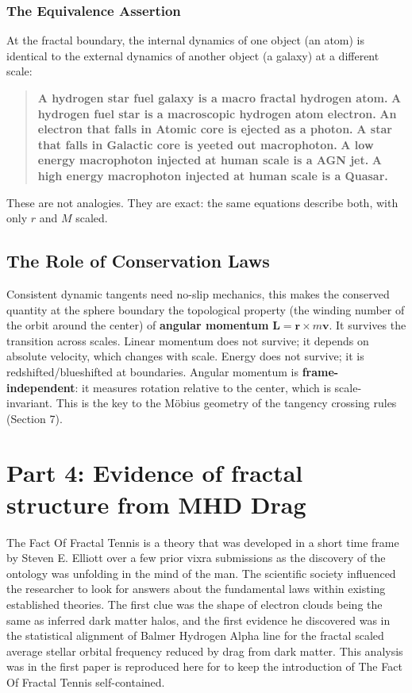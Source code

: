 \documentclass[11pt,a4paper]{article}
\begin{document}
\subsubsection{The Equivalence Assertion}

At the fractal boundary, the internal dynamics of one object (an atom) is identical to the external dynamics of another object (a galaxy) at a different scale:

\begin{quote}
\textbf{A hydrogen star fuel galaxy is a macro fractal hydrogen atom.}
\textbf{A hydrogen fuel star is a macroscopic hydrogen atom electron.}
\textbf{An electron that falls in Atomic core is ejected as a photon.}
\textbf{A star that falls in Galactic core is yeeted out macrophoton.}
\textbf{A low energy macrophoton injected at human scale is a AGN jet.}
\textbf{A high energy macrophoton injected at human scale is a Quasar.}
\end{quote}

These are not analogies. They are exact: the same  equations describe both, with only $r$ and $M$ scaled.

\subsection{The Role of Conservation Laws}

Consistent dynamic tangents need no-slip mechanics, this makes the conserved quantity at the sphere boundary the topological property (the winding number of the orbit around the center) of \textbf{angular momentum} $\mathbf{L} = \mathbf{r} \times m\mathbf{v}$. It survives the transition across scales. Linear momentum does not survive; it depends on absolute velocity, which changes with scale. Energy does not survive; it is redshifted/blueshifted at boundaries. Angular momentum is \textbf{frame-independent}: it measures rotation relative to the center, which is scale-invariant. This is the key to the Möbius geometry of the tangency crossing rules (Section 7).


\section{Part 4: Evidence of fractal structure from MHD Drag}

The Fact Of Fractal Tennis is a theory that was developed in a short time frame by Steven E. Elliott over a few prior vixra submissions as the discovery of the ontology was unfolding in the mind of the man. The scientific society influenced the researcher to look for answers about the fundamental laws within existing established theories. The first clue was the shape of electron clouds being the same as inferred dark matter halos, and the first evidence he discovered was in the statistical alignment of Balmer Hydrogen Alpha line for the fractal scaled average stellar orbital frequency reduced by drag from dark matter. This analysis was in the first paper is reproduced here for to keep the introduction of The Fact Of Fractal Tennis self-contained.
\end{document}
